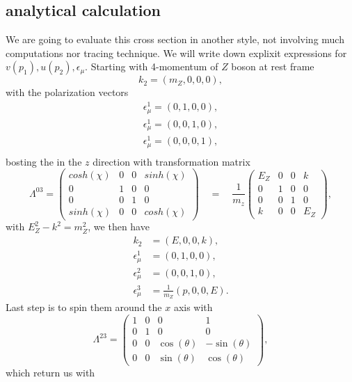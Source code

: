 \documentclass{report}
\newcommand{\nn}{\nonumber}
\numberwithin{equation}{section}
\begin{document}
\subsection{analytical calculation}
\label{analytical}
We are going to evaluate this cross section in another style, not involving much computations nor tracing technique. We will write down explixit expressions for $v(p_1),u(p_2),\epsilon_\mu$. Starting with 4-momentum of $Z$ boson at rest frame
\begin{equation}
k_2=(m_Z,0,0,0),
\end{equation}
with the polarization vectors
\begin{align}
\epsilon^1_\mu=(0,1,0,0),\\
\epsilon^1_\mu=(0,0,1,0),\\
\epsilon^1_\mu=(0,0,0,1),\\
\end{align}
bosting the in the $z$ direction with transformation matrix
\begin{equation}
\Lambda^{03}=\begin{pmatrix}
cosh(\chi)&0&0&sinh(\chi)\\
0&1&0&0\\
0&0&1&0\\
sinh(\chi)&0&0&cosh(\chi)
\end{pmatrix}\quad =\quad\frac{1}{m_z}
\begin{pmatrix}
E_Z&0&0&k\\
0&1&0&0\\
0&0&1&0\\
k&0&0&E_Z
\end{pmatrix},
\end{equation}
with $E_Z^2-k^2=m_Z^2$, we then have
\begin{align}
k_2&=(E,0,0,k),\nn\\
\epsilon^1_\mu&=(0,1,0,0),\nn\\
\epsilon^2_\mu&=(0,0,1,0),\nn\\
\epsilon^3_\mu&=\frac{1}{m_Z}(p,0,0,E).
\end{align}
Last step is to spin them around the $x$ axis with
\begin{equation}
\Lambda^{23}=\begin{pmatrix}
1&0&0&1\\
0&1&0&0\\
0&0&\cos(\theta)&-\sin(\theta)\\
0&0&\sin(\theta)&\cos(\theta)
\end{pmatrix},
\end{equation}
which return us with
\end{document}
